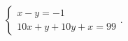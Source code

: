 $\displaystyle
\left\{
\begin{array}{l}
\displaystyle x - y = -1 \\
\displaystyle 10 x + y + 10 y + x = 99
\end{array}
\right.
$. %
